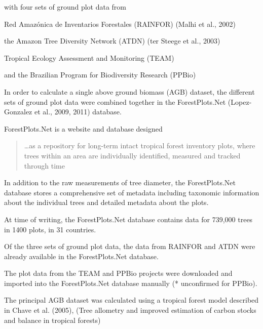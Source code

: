 \documentclass{article}
\begin{document}
with four sets of ground plot data from

Red Amazónica de Inventarios Forestales (RAINFOR) (Malhi et al., 2002)

the
Amazon Tree Diversity Network (ATDN) (ter Steege et al., 2003)

Tropical Ecology Assessment and Monitoring (TEAM)

and the
Brazilian Program for Biodiversity Research (PPBio)


In order to calculate a single above ground biomass (AGB) dataset,
the different sets of ground plot data were
combined together in the
ForestPlots.Net (Lopez-Gonzalez et al., 2009, 2011)
database.

ForestPlots.Net is a website and database designed 
\begin{quote}
\ldots as a repository for long-term intact tropical forest inventory
plots, where trees within an area are individually identified,
measured and tracked through time
\end{quote}

In addition to the raw measurements of tree diameter, the ForestPlots.Net database
stores a comprehensive set of metadata including taxonomic information about
the individual trees and detailed metadata about the plots.

At time of writing, the ForestPlots.Net
database contains data for 739,000 trees
in 1400 plots, in 31 countries.

Of the three sets of ground plot data, 
the data from RAINFOR and ATDN
were already available in the
ForestPlots.Net
database.

The plot data from the TEAM and PPBio projects were downloaded
and imported into the ForestPlots.Net database
manually (* unconfirmed for PPBio).

The principal AGB dataset was calculated using a tropical forest model described in Chave et al. (2005),
(Tree allometry and improved estimation of carbon stocks and balance in tropical forests)
\end{document}
